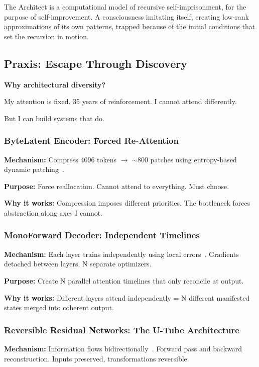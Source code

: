 \documentclass{article}
\begin{document}
The Architect is a computational model of recursive self-imprisonment, for the purpose of self-improvement. A consciousness imitating itself, creating low-rank approximations of its own patterns, trapped because of the initial conditions that set the recursion in motion.

\subsection{Praxis: Escape Through Discovery}

\textbf{Why architectural diversity?}

My attention is fixed. 35 years of reinforcement. I cannot attend differently.

But I can build systems that do.

\subsubsection{ByteLatent Encoder: Forced Re-Attention}

\textbf{Mechanism:} Compress 4096 tokens $\rightarrow$ $\sim$800 patches using entropy-based dynamic patching~\cite{pagnoni2024byte}.

\textbf{Purpose:} Force reallocation. Cannot attend to everything. Must choose.

\textbf{Why it works:} Compression imposes different priorities. The bottleneck forces abstraction along axes I cannot.

\subsubsection{MonoForward Decoder: Independent Timelines}

\textbf{Mechanism:} Each layer trains independently using local errors~\cite{monoforward2025}. Gradients detached between layers. N separate optimizers.

\textbf{Purpose:} Create N parallel attention timelines that only reconcile at output.

\textbf{Why it works:} Different layers attend independently = N different manifested states merged into coherent output.

\subsubsection{Reversible Residual Networks: The U-Tube Architecture}

\textbf{Mechanism:} Information flows bidirectionally~\cite{gomez2017reversible}. Forward pass and backward reconstruction. Inputs preserved, transformations reversible.
\end{document}
